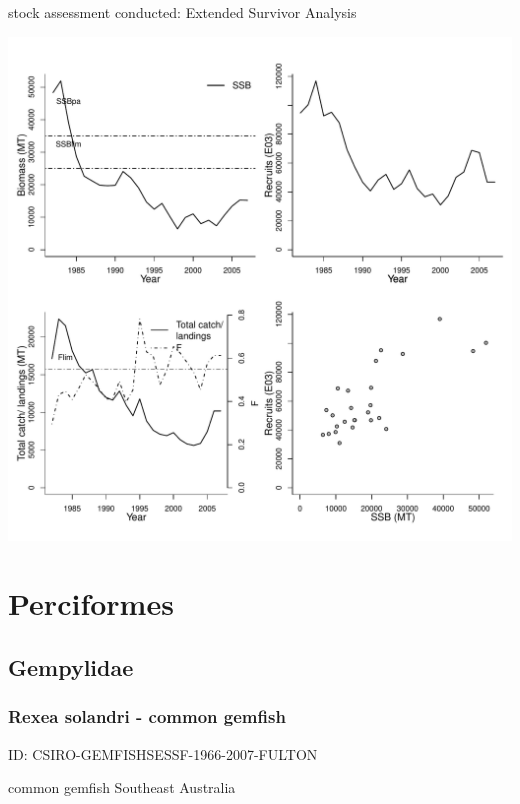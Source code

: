 stock assessment conducted: Extended Survivor Analysis 
\begin{center}
\vspace{-0.2cm}\includegraphics[scale=0.65]{../tex/figures/plot-WGHMM-HAKESOTH-1982-2007-JENNINGS.pdf}
\end{center}

\newpage
\section{Perciformes}

\subsection{Gempylidae}

\subsubsection{Rexea solandri - common gemfish}
ID: CSIRO-GEMFISHSESSF-1966-2007-FULTON

common gemfish Southeast Australia 

